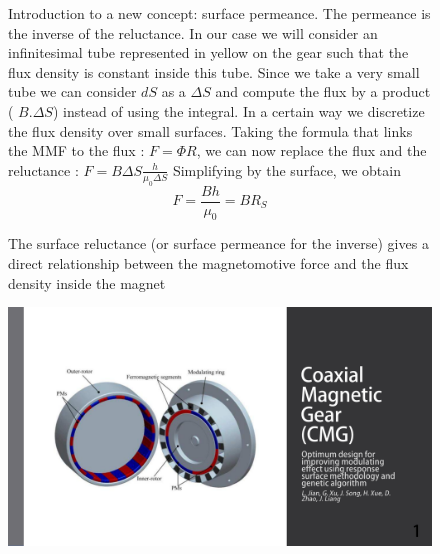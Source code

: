 \begin{figure}[H]
    \begin{minipage}{.45\linewidth}
    
        Introduction to a new concept: surface permeance. The permeance is the inverse of the reluctance. 
        In our case we will consider an infinitesimal tube represented in yellow on the gear such that the flux density is constant inside this tube. Since we take a very small tube we can consider $dS$ as a $\Delta S$ and compute the flux by a product ( $ B.\Delta S$) instead of using the integral. In a certain way we discretize the flux density over small surfaces.
        Taking the formula that links the MMF to the flux : $F = \Phi R$, we can now replace the flux and the reluctance : $F = B \Delta S \frac{h}{\mu_0\Delta S}$ Simplifying by the surface, we obtain $$ F = \frac{ B h}{\mu_0 }  = B R_S $$
        
       The surface reluctance (or surface permeance for the inverse) gives a direct relationship between the magnetomotive force and the flux density inside the magnet 
       
    \end{minipage}
    \hfill%
    \begin{minipage}[c]{.45\linewidth}
        \centering
        \includegraphics[page={15},width=\textwidth]{LELEC2311.allow.pdf}
    \end{minipage}
\end{figure}

